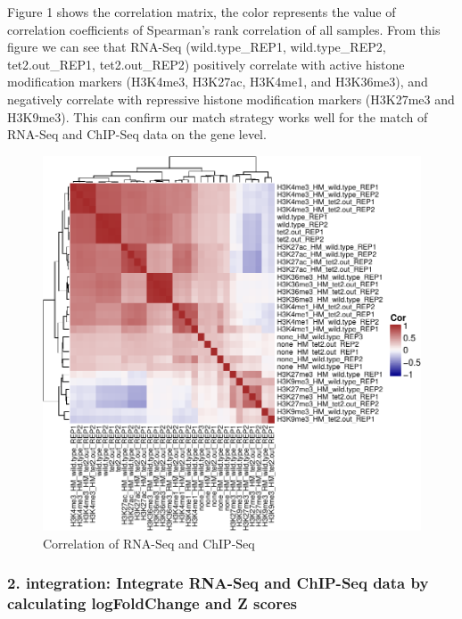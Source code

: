 \documentclass[10pt,]{article}
\begin{document}
Figure 1 shows the correlation matrix, the color represents the value of
correlation coefficients of Spearman's rank correlation of all samples.
From this figure we can see that RNA-Seq (wild.type\_REP1,
wild.type\_REP2, tet2.out\_REP1, tet2.out\_REP2) positively correlate
with active histone modification markers (H3K4me3, H3K27ac, H3K4me1, and
H3K36me3), and negatively correlate with repressive histone modification
markers (H3K27me3 and H3K9me3). This can confirm our match strategy
works well for the match of RNA-Seq and ChIP-Seq data on the gene level.

\begin{figure}
\centering
\includegraphics{supplement_file_files/figure-latex/unnamed-chunk-9-1.pdf}
\caption{Correlation of RNA-Seq and ChIP-Seq}
\end{figure}

\newpage

\hypertarget{integration-integrate-rna-seq-and-chip-seq-data-by-calculating-logfoldchange-and-z-scores}{%
\subsubsection{\texorpdfstring{2. \textbf{integration}: Integrate
RNA-Seq and ChIP-Seq data by calculating logFoldChange and Z
scores}{2. integration: Integrate RNA-Seq and ChIP-Seq data by calculating logFoldChange and Z scores}}\label{integration-integrate-rna-seq-and-chip-seq-data-by-calculating-logfoldchange-and-z-scores}}
\end{document}
